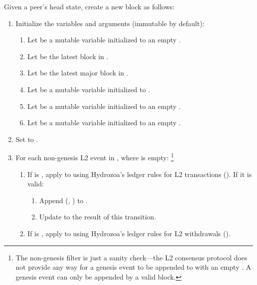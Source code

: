 \documentclass[../hydrozoa.tex]{subfiles}
\begin{document}
Given a peer's head state, create a new block as follows:
\begin{enumerate}
  \item Initialize the variables and arguments (immutable by default):
    \begin{enumerate}
      \item Let  be a mutable variable initialized to an empty .
      \item Let  be the latest block in .
      \item Let  be the latest major block in .
      \item Let  be a mutable variable initialized to .
      \item Let  be a mutable variable initialized to an empty .
      \item Let  be a mutable variable initialized to an empty .
    \end{enumerate}
  \item Set  to .
  \item For each non-genesis L2 event  in , where  is empty:%
    \footnote{The non-genesis filter is just a sanity check---the L2 consensus protocol does not provide any way for a genesis event to be appended to  with an empty .
      A genesis event can only be appended by a valid block.
      }
      \begin{enumerate}
        \item If  is , apply  to  using Hydrozoa's ledger rules for L2 transactions ().
          If it is valid:
          \begin{enumerate}
            \item Append (, ) to .
            \item Update  to the result of this transition.
          \end{enumerate}
        \item If  is , apply  to  using Hydrozoa's ledger rules for L2 withdrawals ().

\end{enumerate}
\end{enumerate}
\end{document}
